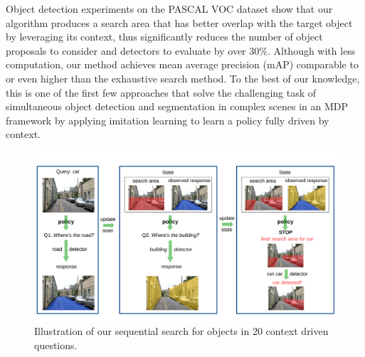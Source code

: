 Object detection experiments on the PASCAL VOC dataset show that our algorithm produces a search area that has better overlap with the target object by leveraging its context, 
thus significantly reduces the number of object proposals to consider and detectors to evaluate by over $30\%$.
Although with less computation, our method achieves mean average precision (mAP) comparable to or even higher than the exhaustive search method. 
To the best of our knowledge, this is one of the first few approaches that solve the challenging task of simultaneous object detection and segmentation in complex scenes in an MDP framework by applying imitation learning to learn a policy fully driven by context.


\begin{figure}[htb]
\begin{center}
\includegraphics[width=\linewidth]{figures/iccv20q-overview.pdf}
\caption{Illustration of our sequential search for objects in 20 context driven questions.}
\label{fig:20Qintro}
\end{center}
\end{figure}






